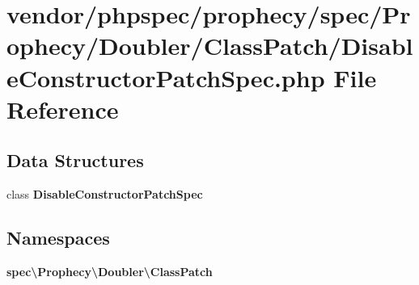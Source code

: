 \section{vendor/phpspec/prophecy/spec/\+Prophecy/\+Doubler/\+Class\+Patch/\+Disable\+Constructor\+Patch\+Spec.php File Reference}
\label{_disable_constructor_patch_spec_8php}
\subsection*{Data Structures}
\begin{DoxyCompactItemize}
\item 
class {\bf Disable\+Constructor\+Patch\+Spec}
\end{DoxyCompactItemize}
\subsection*{Namespaces}
\begin{DoxyCompactItemize}
\item 
 {\bf spec\textbackslash{}\+Prophecy\textbackslash{}\+Doubler\textbackslash{}\+Class\+Patch}
\end{DoxyCompactItemize}
